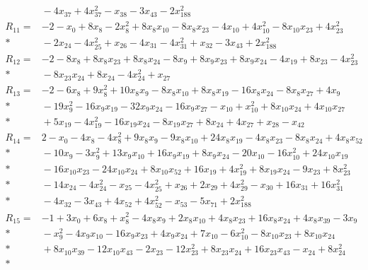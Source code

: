 \begin{align*}
&{} - 4x_{37} + 4x_{37}^{2} - x_{38} - 3x_{43} - 2x_{188}^{2} \\[4pt]
R_{11} ={}& -2 - x_{0} + 8x_{8} - 2x_{8}^{2} + 8x_{8}x_{10} - 8x_{8}x_{23} - 4x_{10} + 4x_{10}^{2} - 8x_{10}x_{23} + 4x_{23}^{2} \\*
&{} - 2x_{24} - 4x_{25}^{2} + x_{26} - 4x_{31} - 4x_{31}^{2} + x_{32} - 3x_{43} + 2x_{188}^{2} \\[4pt]
R_{12} ={}& -2 - 8x_{8} + 8x_{8}x_{23} + 8x_{8}x_{24} - 8x_{9} + 8x_{9}x_{23} + 8x_{9}x_{24} - 4x_{19} + 8x_{23} - 4x_{23}^{2} \\*
&{} - 8x_{23}x_{24} + 8x_{24} - 4x_{24}^{2} + x_{27} \\[4pt]
R_{13} ={}& -2 - 6x_{8} + 9x_{8}^{2} + 10x_{8}x_{9} - 8x_{8}x_{10} + 8x_{8}x_{19} - 16x_{8}x_{24} - 8x_{8}x_{27} + 4x_{9} \\*
&{} - 19x_{9}^{2} - 16x_{9}x_{19} - 32x_{9}x_{24} - 16x_{9}x_{27} - x_{10} + x_{10}^{2} + 8x_{10}x_{24} + 4x_{10}x_{27} \\*
&{} + 5x_{19} - 4x_{19}^{2} - 16x_{19}x_{24} - 8x_{19}x_{27} + 8x_{24} + 4x_{27} + x_{28} - x_{42} \\[4pt]
R_{14} ={}& 2 - x_{0} - 4x_{8} - 4x_{8}^{2} + 9x_{8}x_{9} - 9x_{8}x_{10} + 24x_{8}x_{19} - 4x_{8}x_{23} - 8x_{8}x_{24} + 4x_{8}x_{52} \\*
&{} - 10x_{9} - 3x_{9}^{2} + 13x_{9}x_{10} + 16x_{9}x_{19} + 8x_{9}x_{24} - 20x_{10} - 16x_{10}^{2} + 24x_{10}x_{19} \\*
&{} - 16x_{10}x_{23} - 24x_{10}x_{24} + 8x_{10}x_{52} + 16x_{19} + 4x_{19}^{2} + 8x_{19}x_{24} - 9x_{23} + 8x_{23}^{2} \\*
&{} - 14x_{24} - 4x_{24}^{2} - x_{25} - 4x_{25}^{2} + x_{26} + 2x_{29} + 4x_{29}^{2} - x_{30} + 16x_{31} + 16x_{31}^{2} \\*
&{} - 4x_{32} - 3x_{43} + 4x_{52} + 4x_{52}^{2} - x_{53} - 5x_{71} + 2x_{188}^{2} \\[4pt]
R_{15} ={}& -1 + 3x_{0} + 6x_{8} + x_{8}^{2} - 4x_{8}x_{9} + 2x_{8}x_{10} + 4x_{8}x_{23} + 16x_{8}x_{24} + 4x_{8}x_{39} - 3x_{9} \\*
&{} - x_{9}^{2} - 4x_{9}x_{10} - 16x_{9}x_{23} + 4x_{9}x_{24} + 7x_{10} - 6x_{10}^{2} - 8x_{10}x_{23} + 8x_{10}x_{24} \\*
&{} + 8x_{10}x_{39} - 12x_{10}x_{43} - 2x_{23} - 12x_{23}^{2} + 8x_{23}x_{24} + 16x_{23}x_{43} - x_{24} + 8x_{24}^{2} \\*

\end{align*}
